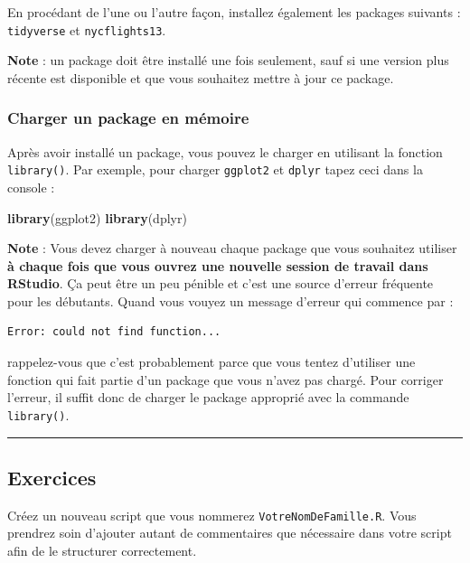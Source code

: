 \documentclass[
  a4paper,
]{article}
\newenvironment{Shaded}{\begin{snugshade}}{\end{snugshade}}
\newcommand{\KeywordTok}[1]{\textcolor[rgb]{0.12,0.11,0.11}{\textbf{#1}}}
\newcommand{\NormalTok}[1]{\textcolor[rgb]{0.12,0.11,0.11}{#1}}
\begin{document}
En procédant de l'une ou l'autre façon, installez également les packages suivants : \texttt{tidyverse} et \texttt{nycflights13}.

\textbf{Note} : un package doit être installé une fois seulement, sauf si une version plus récente est disponible et que vous souhaitez mettre à jour ce package.

\hypertarget{charger-un-package-en-muxe9moire}{%
\subsubsection{Charger un package en mémoire}\label{charger-un-package-en-muxe9moire}}

Après avoir installé un package, vous pouvez le charger en utilisant la fonction \texttt{library()}. Par exemple, pour charger \texttt{ggplot2} et \texttt{dplyr} tapez ceci dans la console :

\begin{Shaded}
\begin{Highlighting}[]
\KeywordTok{library}\NormalTok{(ggplot2)}
\KeywordTok{library}\NormalTok{(dplyr)}
\end{Highlighting}
\end{Shaded}

\textbf{Note} : Vous devez charger à nouveau chaque package que vous souhaitez utiliser \textbf{à chaque fois que vous ouvrez une nouvelle session de travail dans RStudio}. Ça peut être un peu pénible et c'est une source d'erreur fréquente pour les débutants. Quand vous vouyez un message d'erreur qui commence par :

\begin{verbatim}
Error: could not find function...
\end{verbatim}

rappelez-vous que c'est probablement parce que vous tentez d'utiliser une fonction qui fait partie d'un package que vous n'avez pas chargé. Pour corriger l'erreur, il suffit donc de charger le package approprié avec la commande \texttt{library()}.

\begin{center}\rule{0.5\linewidth}{0.5pt}\end{center}

\hypertarget{exercices}{%
\subsection{Exercices}\label{exercices}}

Créez un nouveau script que vous nommerez \texttt{VotreNomDeFamille.R}. Vous prendrez soin d'ajouter autant de commentaires que nécessaire dans votre script afin de le structurer correctement.
\end{document}
